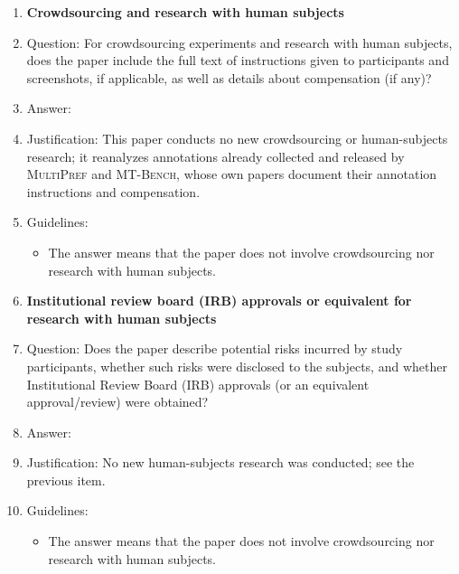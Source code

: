 \documentclass{article}
\begin{document}
\begin{enumerate}
\item {\bf Crowdsourcing and research with human subjects}
    \item[] Question: For crowdsourcing experiments and research with human subjects, does the paper include the full text of instructions given to participants and screenshots, if applicable, as well as details about compensation (if any)?
    \item[] Answer: \answerNA{}
    \item[] Justification: This paper conducts no new crowdsourcing or human-subjects research; it reanalyzes annotations already collected and released by \textsc{MultiPref} and \textsc{MT-Bench}, whose own papers document their annotation instructions and compensation.
    \item[] Guidelines:
    \begin{itemize}
        \item The answer \answerNA{} means that the paper does not involve crowdsourcing nor research with human subjects.
    \end{itemize}

\item {\bf Institutional review board (IRB) approvals or equivalent for research with human subjects}
    \item[] Question: Does the paper describe potential risks incurred by study participants, whether such risks were disclosed to the subjects, and whether Institutional Review Board (IRB) approvals (or an equivalent approval/review) were obtained?
    \item[] Answer: \answerNA{}
    \item[] Justification: No new human-subjects research was conducted; see the previous item.
    \item[] Guidelines:
    \begin{itemize}
        \item The answer \answerNA{} means that the paper does not involve crowdsourcing nor research with human subjects.
    \end{itemize}


\end{enumerate}
\end{document}
